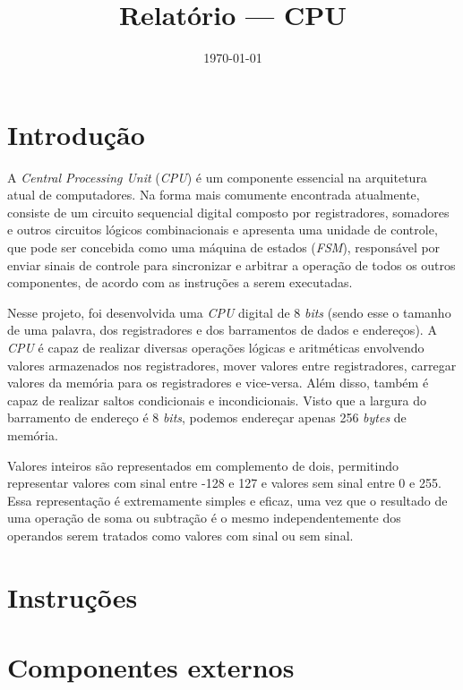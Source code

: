 \documentclass[a4paper,12pt]{report}
\title{Relatório --- CPU}
\date{\today}
\begin{document}
\maketitle

\section*{Introdução}

A \textit{Central Processing Unit} (\textit{CPU}) é um componente essencial
na arquitetura atual de computadores. Na forma mais comumente encontrada atualmente,
consiste de um circuito sequencial digital composto por registradores, somadores
e outros circuitos lógicos combinacionais e apresenta uma unidade de controle,
que pode ser concebida como uma máquina de estados (\textit{FSM}), responsável 
por enviar sinais de controle para sincronizar e arbitrar a operação de todos 
os outros componentes, de acordo com as instruções a serem executadas.

Nesse projeto, foi desenvolvida uma \textit{CPU} digital de 8 \textit{bits} (sendo
esse o tamanho de uma palavra, dos registradores e dos barramentos de dados e endereços).
A \textit{CPU} é capaz de realizar diversas operações lógicas e aritméticas 
envolvendo valores armazenados nos registradores, mover valores entre registradores,
carregar valores da memória para os registradores e vice-versa. Além disso, também é 
capaz de realizar saltos condicionais e incondicionais. Visto que a largura do 
barramento de endereço é 8 \textit{bits}, podemos endereçar apenas 256 \textit{bytes} 
de memória. 

Valores inteiros são representados em complemento de dois, permitindo
representar valores com sinal entre -128 e 127 e valores sem sinal entre 0 e 255.
Essa representação é extremamente simples e eficaz, uma vez que o resultado de
uma operação de soma ou subtração é o mesmo independentemente dos operandos serem 
tratados como valores com sinal ou sem sinal.

\section*{Instruções}

\begin{itemize}

\end{itemize}

\section*{Componentes externos}
\end{document}
